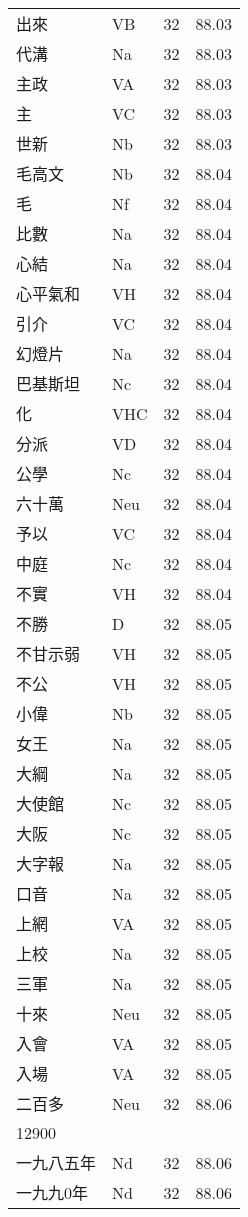 \documentclass[twocolumn]{book}
\begin{document}
\begin{supertabular}{llrr}
出來 & VB & 32 &  88.03\\
代溝 & Na & 32 &  88.03\\
主政 & VA & 32 &  88.03\\
主 & VC & 32 &  88.03\\
世新 & Nb & 32 &  88.03\\
毛高文 & Nb & 32 &  88.04\\
毛 & Nf & 32 &  88.04\\
比數 & Na & 32 &  88.04\\
心結 & Na & 32 &  88.04\\
心平氣和 & VH & 32 &  88.04\\
引介 & VC & 32 &  88.04\\
幻燈片 & Na & 32 &  88.04\\
巴基斯坦 & Nc & 32 &  88.04\\
化 & VHC & 32 &  88.04\\
分派 & VD & 32 &  88.04\\
公學 & Nc & 32 &  88.04\\
六十萬 & Neu & 32 &  88.04\\
予以 & VC & 32 &  88.04\\
中庭 & Nc & 32 &  88.04\\
不實 & VH & 32 &  88.04\\
不勝 & D & 32 &  88.05\\
不甘示弱 & VH & 32 &  88.05\\
不公 & VH & 32 &  88.05\\
小偉 & Nb & 32 &  88.05\\
女王 & Na & 32 &  88.05\\
大綱 & Na & 32 &  88.05\\
大使館 & Nc & 32 &  88.05\\
大阪 & Nc & 32 &  88.05\\
大字報 & Na & 32 &  88.05\\
口音 & Na & 32 &  88.05\\
上網 & VA & 32 &  88.05\\
上校 & Na & 32 &  88.05\\
三軍 & Na & 32 &  88.05\\
十來 & Neu & 32 &  88.05\\
入會 & VA & 32 &  88.05\\
入場 & VA & 32 &  88.05\\
二百多 & Neu & 32 &  88.06\\
12900\\
一九八五年 & Nd & 32 &  88.06\\
一九九0年 & Nd & 32 &  88.06\\

\end{supertabular}
\end{document}
